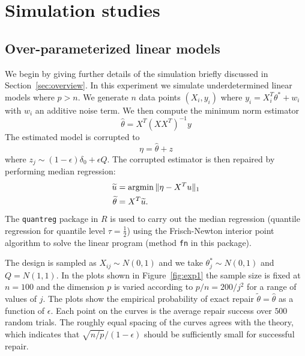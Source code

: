 
\section{Simulation studies}
\label{sec:experiments}

\subsection{Over-parameterized linear models}


We begin by giving further details of the simulation briefly discussed
in Section~\ref{sec:overview}. In this experiment we simulate underdetermined linear models where $p > n$.
We generate $n$ data points $(X_i, y_i)$ where
$y_i = X_i^T \theta^* + w_i$ with $w_i$ an additive noise term. We then compute the minimum norm estimator
\begin{equation}
  \hat\theta = X^T (X X^T)^{-1} y
\end{equation}
The estimated model is corrupted to
\begin{equation}
  \eta = \hat\theta + z
\end{equation}
where $z_j \sim (1-\epsilon) \delta_0 +\epsilon Q$. The corrupted estimator is then repaired by performing median regression:
\begin{align}
  \tilde u &= \argmin \|\eta - X^T u\|_1 \\
  \tilde \theta &= X^T \tilde u.
\end{align}
The \texttt{quantreg} package in $R$ is used to carry out the median regression (quantile regression for quantile level $\tau = \frac{1}{2}$) using the Frisch-Newton interior point algorithm to solve the linear program (method \texttt{fn} in this package).

The design is sampled as $X_{ij} \sim N(0,1)$ and we take $\theta_j^* \sim N(0,1)$ and $Q = N(1,1)$. In the plots shown
in Figure~\ref{fig:exp1} the sample size is fixed at $n=100$ and the dimension $p$ is varied according to $p/n=200/j^2$
for a range of values of $j$. The plots show the empirical probability of exact repair $\tilde\theta = \hat\theta$ as a function of $\epsilon$. Each point on the curves is the average repair success over $500$ random trials.
The roughly equal spacing of the curves agrees with the theory, which indicates that $\sqrt{n/p}/(1-\epsilon)$ should be sufficiently small for successful repair.

